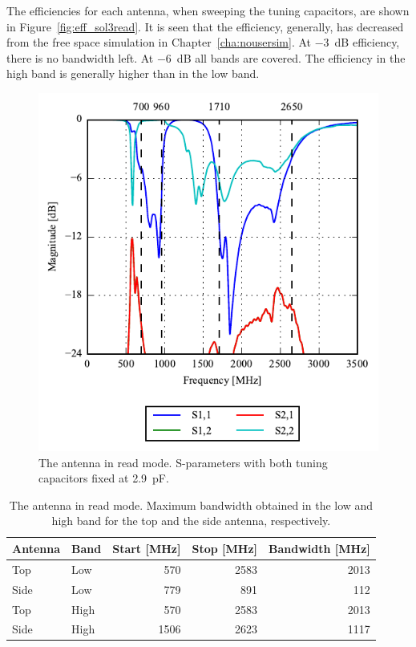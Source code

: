 The efficiencies for each antenna, when sweeping the tuning capacitors, are shown in Figure~\ref{fig:eff_sol3read}. It is seen that the efficiency, generally, has decreased from the free space simulation in Chapter~\ref{cha:nousersim}. At  \SI{-3}{dB} efficiency, there is no bandwidth left. At \SI{-6}{dB} all bands are covered. The efficiency in the high band is generally higher than in the low band.

\begin{figure}[htbp]
    \centering
    \includegraphics{img/tech_sol/nonresonant/simulation/read_mode/s_params_cMax.pdf}
    \caption{The antenna in read mode. S-parameters with both tuning capacitors fixed at \SI{2.9}{pF}.}
    \label{fig:ant3_sparam_read}
\end{figure}

\begin{table}[htbp]
    \centering
    \begin{tabular}{|l|l|r|r|r|}
        \hline
        Antenna & Band & Start [MHz] & Stop [MHz] & Bandwidth [MHz] \\
        \hline
        Top     & Low  & 570         & 2583       & 2013 \\
        Side    & Low  & 779         & 891        & 112  \\
        \hline
        Top     & High & 570         & 2583       & 2013 \\
        Side    & High & 1506        & 2623       & 1117 \\
        \hline
    \end{tabular}
    \caption{The antenna in read mode. Maximum bandwidth obtained in the low and high band for the top and the side antenna, respectively.}
    \label{tab:bw_sol3read}
\end{table}


